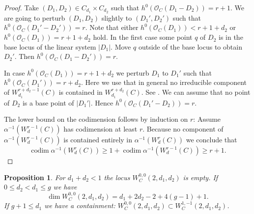 \documentclass[12pt]{extarticle}
\newtheorem{proposition}[theorem]{Proposition}
\theoremstyle{definition}
\numberwithin{theorem}{section}
\newcommand{\OO}{\mathcal{O}}
\newcommand{\op}{\operatorname}
\begin{document}
\begin{proof}
Take $(D_1,D_2)\in C_{d_1}\times C_{d_2}$ such that $h^0(\OO_C(D_1 - D_2)) = r+1$. We are going to perturb $(D_1,D_2)$ slightly to $(D_1',D_2')$ such that $h^0(\OO_C(D_1'-D_2')) = r$. Note that either $h^0(\OO_C(D_1)) < r+1 + d_2$ or $h^0(\OO_C(D_1)) = r+1 + d_2$ hold. In the first case some point $q$ of $D_2$ is in the base locus of the linear system $|D_1|$. Move $q$ outside of the base locus to obtain $D_2'$. Then $h^0(\OO_C(D_1 - D_2')) = r$. 

In case $h^0(\OO_C(D_1)) = r+1+d_2$ we perturb $D_1$ to $D_1'$ such that $h^0(\OO_C(D_1')) = r+ d_2$. Here we use that in general no irreducible component of $W^{r+d_2-1}_{d_1}(C)$ is contained in $W_{d_1}^{r+d_2}(C)$. See \cite[chapter IV, Lemma 3.5]{ACGH}. We can assume that no point of $D_2$ is a base point of $|D_1'|$. Hence $h^0(\OO_C(D_1'-D_2)) = r$.   

The lower bound on the codimension follows by induction on $r$: Assume $\alpha^{-1}(W^{r-1}_d(C))$ has codimension at least $r$. Because no component of $\alpha^{-1}(W^{r-1}_d(C)) $ is contained entirely in $\alpha^{-1}(W^r_d(C))$ we conclude that 
\begin{equation*}
\op{codim} \alpha^{-1}(W^r_d(C)) \geq 1+ \op{codim} \alpha^{-1}(W^{r-1}_d(C))\geq r+1.
\end{equation*}
\end{proof}
\begin{proposition}\label{prop:unstable_ii}
For $d_1 + d_2 < 1$ the locus $W_C^{0,0}(2,d_1,d_2)$ is empty. If $0 \leq d_2 < d_1 \leq g$ we have
\begin{equation*}
\dim W_C^{0,0}(2,d_1,d_2) = d_1 + 2d_2 -2 + 4(g-1)+1.
\end{equation*}
If $g+1\leq d_1$ we have a containment: $W_C^{0,0}(2,d_1,d_2) \subset W_C^{1,-1}(2,d_1,d_2)$.
\end{proposition}
\end{document}
